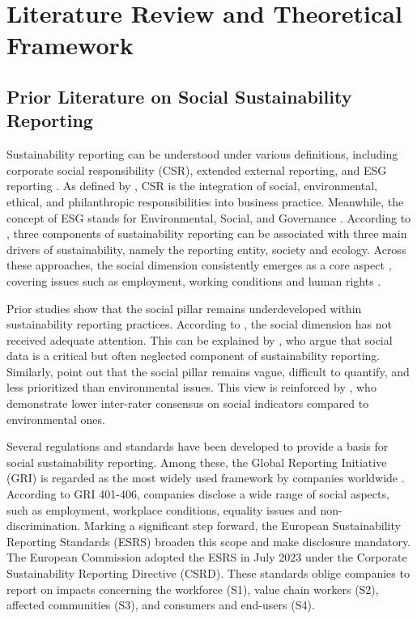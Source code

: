 \chapter{Literature Review and Theoretical Framework}
\label{chap:background}
\section{Prior Literature on Social Sustainability Reporting}

Sustainability reporting can be understood under various definitions, 
including corporate social responsibility (CSR), extended external reporting, 
and ESG reporting \parencite{Edge2022}. As defined by \parencite{Rasche2017}, CSR is the integration of social, 
environmental, ethical, and philanthropic responsibilities into business practice. 
Meanwhile, the concept of ESG stands for Environmental, Social, and Governance \parencite{UNGlobal2024}.
According to \parencite{Krivogorsky2024}, three components of sustainability reporting 
can be associated with three main drivers of sustainability, namely the reporting entity, 
society and ecology. Across these approaches, the social dimension consistently emerges 
as a core aspect \parencite{Rasche2017, UNGlobal2024, Krivogorsky2024}, covering issues 
such as employment, working conditions and human rights \parencite{Fiechter2022, Morais2018}.

Prior studies show that the social pillar remains underdeveloped 
within sustainability reporting practices. According to \textcite{Heldal2024}, the social dimension 
has not received adequate attention. This can be explained by \textcite{Sharma2024}, who argue that
social data is a critical but often neglected component of sustainability reporting. Similarly, 
\textcite{Morais2018} point out that the social pillar remains vague, difficult to quantify, 
and less prioritized than environmental issues. This view is reinforced by \textcite{Berg2022}, 
who demonstrate lower inter-rater consensus on social indicators compared to environmental ones.

Several regulations and standards have been developed to provide a basis for social sustainability reporting.
Among these, the Global Reporting Initiative (GRI) is regarded as the most widely used framework 
by companies worldwide \parencite{Bais2024, vanOorschot2024}. 
According to GRI 401-406, companies disclose a wide range of social aspects, such as employment,
workplace conditions, equality issues and non-discrimination.
Marking a significant step forward, the European Sustainability Reporting Standards (ESRS) 
broaden this scope and make disclosure mandatory. The European Commission adopted the ESRS 
in July 2023 under the Corporate Sustainability Reporting Directive (CSRD). These standards 
oblige companies to report on impacts concerning the workforce (S1), value chain workers (S2), 
affected communities (S3), and consumers and end-users (S4).

